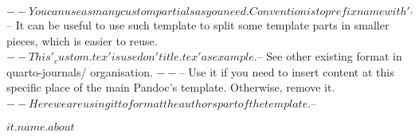 $-- You can use as many custom partials as you need. Convention is to prefix name with '_'
$-- It can be useful to use such template to split some template parts in smaller pieces, which is easier to reuse. 
$-- This '_custom.tex' is used on 'title.tex' as example.
$-- See other existing format in quarto-journals/ organisation.
$-- %
$-- Use it if you need to insert content at this specific place of the main Pandoc's template. Otherwise, remove it.
$-- Here we are using it to format the authors part of the template.
$-- %

$it.name.about$

